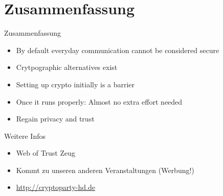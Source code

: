 \section[Zusammenfassung]{Zusammenfassung}

\begin{frame}{Zusammenfassung}
	\begin{itemize}
		\item By default everyday communication cannot be considered secure
		\vspace{3pt}
		\item Crytpographic alternatives exist
		\vspace{3pt}
		\item Setting up crypto initially is a barrier
		\vspace{3pt}
		\item Once it runs properly: Almost no extra effort needed
		\vspace{3pt}
		\item Regain privacy and trust
	\end{itemize}
\end{frame}

\begin{frame}{Weitere Infos}
	\begin{itemize}
		\item Web of Trust Zeug
		\item Kommt zu unseren anderen Veranstaltungen (Werbung!)
		\item \url{http://cryptoparty-hd.de}
	\end{itemize}
\end{frame}

